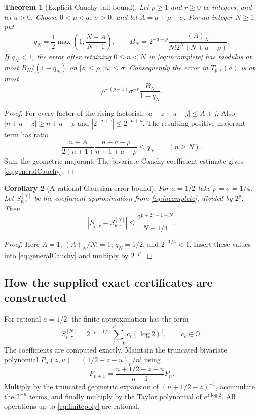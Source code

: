 \documentclass[11pt]{article}
\numberwithin{equation}{section}
\newtheorem{theorem}{Theorem}[section]
\newtheorem{corollary}[theorem]{Corollary}
\theoremstyle{definition}\newtheorem{definition}[theorem]{Definition}
\theoremstyle{remark}\newtheorem{remark}[theorem]{Remark}
\newcommand{\Q}{\mathbb Q}\newcommand{\C}{\mathbb C}
\begin{document}
\begin{theorem}[Explicit Cauchy tail bound]\label{thm:cauchy}
Let $p\ge1$ and $r\ge0$ be integers, and let $a>0$. Choose $0<\rho<a$, $\sigma>0$, and let $A=a+\rho+\sigma$. For an integer $N\ge1$, put
\[
 q_N=\frac12\max\left(1,\frac{N+A}{N+1}\right),
 \qquad
 B_N=2^{-a+\rho}\frac{(A)_N}{N!2^N(N+a-\rho)}.
\]
If $q_N<1$, the error after retaining $0\le n<N$ in \eqref{eq:incomplete} has modulus at most $B_N/(1-q_N)$ on $|z|\le\rho,|u|\le\sigma$. Consequently the error in $T_{p,r}(a)$ is at most
\begin{equation}\label{eq:generalCauchy}
 \rho^{-(p-1)}\sigma^{-r}\frac{B_N}{1-q_N}.
\end{equation}
\end{theorem}
\begin{proof}
For every factor of the rising factorial,
$|a-z-u+j|\le A+j$. Also
$|n+a-z|\ge n+a-\rho$ and
$|2^{-a+z}|\le2^{-a+\rho}$. The resulting positive majorant term has ratio
\[
 \frac{n+A}{2(n+1)}\frac{n+a-\rho}{n+1+a-\rho}\le q_N
 \qquad(n\ge N).
\]
Sum the geometric majorant. The bivariate Cauchy coefficient estimate gives \eqref{eq:generalCauchy}.
\end{proof}

\begin{corollary}[A rational Gaussian error bound]\label{cor:rationalBound}
For $a=1/2$ take $\rho=\sigma=1/4$. Let $S_{p,r}^{[N]}$ be the coefficient approximation from \eqref{eq:incomplete}, divided by $2^p$. Then
\begin{equation}\label{eq:rationalBound}
 \boxed{\qquad
 |S_{p,r}-S_{p,r}^{[N]}|
 \le\frac{2^{p+2r-1-N}}{N+1/4}.
 \qquad}
\end{equation}
\end{corollary}
\begin{proof}
Here $A=1$, $(A)_N/N!=1$, $q_N=1/2$, and $2^{-1/4}<1$. Insert these values into \eqref{eq:generalCauchy} and multiply by $2^{-p}$.
\end{proof}

\subsection{How the supplied exact certificates are constructed}
For rational $a=1/2$, the finite approximation has the form
\begin{equation}\label{eq:finitepoly}
 S_{p,r}^{[N]}=2^{-p-1/2}\sum_{\ell=0}^{p-1}c_\ell(\log2)^\ell,
 \qquad c_\ell\in\Q.
\end{equation}
The coefficients are computed exactly. Maintain the truncated bivariate polynomial
$P_n(z,u)=(1/2-z-u)_n/n!$ using
\[
 P_{n+1}=\frac{n+1/2-z-u}{n+1}P_n.
\]
Multiply by the truncated geometric expansion of $(n+1/2-z)^{-1}$, accumulate the $2^{-n}$ terms, and finally multiply by the Taylor polynomial of $e^{z\log2}$. All operations up to \eqref{eq:finitepoly} are rational.
\end{document}
